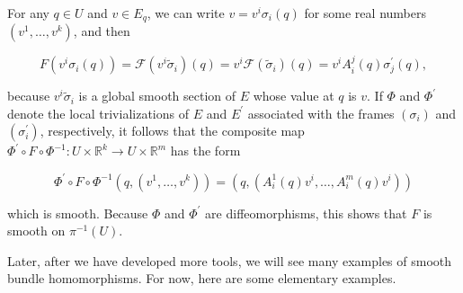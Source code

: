 \documentclass[10pt, letterpaper]{article}
\begin{document}
For any $q \in U$ and $v \in E_{q}$, we can write $v=v^{i} \sigma_{i}(q)$ for some real numbers $\left(v^{1}, \ldots, v^{k}\right)$, and then

$$
F\left(v^{i} \sigma_{i}(q)\right)=\mathcal{F}\left(v^{i} \widetilde{\sigma}_{i}\right)(q)=v^{i} \mathcal{F}\left(\widetilde{\sigma}_{i}\right)(q)=v^{i} A_{i}^{j}(q) \sigma_{j}^{\prime}(q),
$$

because $v^{i} \widetilde{\sigma}_{i}$ is a global smooth section of $E$ whose value at $q$ is $v$. If $\Phi$ and $\Phi^{\prime}$ denote the local trivializations of $E$ and $E^{\prime}$ associated with the frames $\left(\sigma_{i}\right)$ and $\left(\sigma_{i}^{\prime}\right)$, respectively, it follows that the composite map $\Phi^{\prime} \circ F \circ \Phi^{-1}: U \times \mathbb{R}^{k} \rightarrow U \times \mathbb{R}^{m}$ has the form

$$
\Phi^{\prime} \circ F \circ \Phi^{-1}\left(q,\left(v^{1}, \ldots, v^{k}\right)\right)=\left(q,\left(A_{i}^{1}(q) v^{i}, \ldots, A_{i}^{m}(q) v^{i}\right)\right)
$$

which is smooth. Because $\Phi$ and $\Phi^{\prime}$ are diffeomorphisms, this shows that $F$ is smooth on $\pi^{-1}(U)$.

Later, after we have developed more tools, we will see many examples of smooth bundle homomorphisms. For now, here are some elementary examples.
\end{document}
